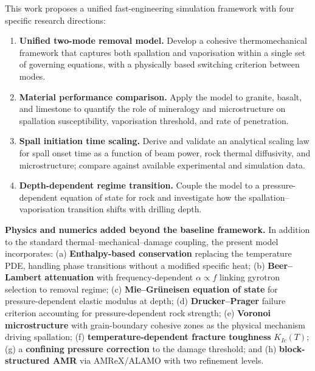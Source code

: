 \documentclass[12pt, a4paper]{article}
\begin{document}
This work proposes a unified fast-engineering simulation framework with four
specific research directions:

\begin{enumerate}[leftmargin=*, noitemsep]
    \item \textbf{Unified two-mode removal model.}  Develop a cohesive
    thermomechanical framework that captures both spallation and vaporisation
    within a single set of governing equations, with a physically based switching
    criterion between modes.

    \item \textbf{Material performance comparison.}  Apply the model to granite,
    basalt, and limestone to quantify the role of mineralogy and microstructure on
    spallation susceptibility, vaporisation threshold, and rate of penetration.

    \item \textbf{Spall initiation time scaling.}  Derive and validate an
    analytical scaling law for spall onset time as a function of beam power, rock
    thermal diffusivity, and microstructure; compare against available experimental
    and simulation data.

    \item \textbf{Depth-dependent regime transition.}  Couple the model to a
    pressure-dependent equation of state for rock and investigate how the
    spallation--vaporisation transition shifts with drilling depth.
\end{enumerate}

\begin{remarbox}
\textbf{Physics and numerics added beyond the baseline framework.}
In addition to the standard thermal--mechanical--damage coupling, the present
model incorporates:
(a) \textbf{Enthalpy-based conservation} replacing the temperature PDE, handling
phase transitions without a modified specific heat;
(b) \textbf{Beer--Lambert attenuation} with frequency-dependent $\alpha \propto f$
linking gyrotron selection to removal regime;
(c) \textbf{Mie--Gr\"{u}neisen equation of state} for pressure-dependent
elastic modulus at depth;
(d) \textbf{Drucker--Prager} failure criterion accounting for pressure-dependent
rock strength;
(e) \textbf{Voronoi microstructure} with grain-boundary cohesive zones as the
physical mechanism driving spallation;
(f) \textbf{temperature-dependent fracture toughness} $K_{Ic}(T)$;
(g) a \textbf{confining pressure correction} to the damage threshold; and
(h) \textbf{block-structured AMR} via AMReX/ALAMO with two refinement levels.
\end{remarbox}
\end{document}

